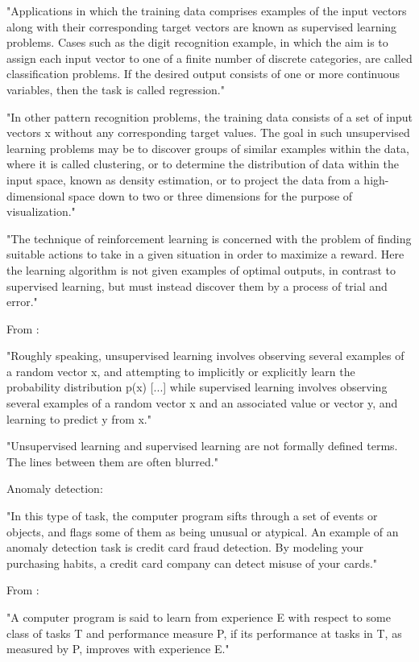 "Applications in which the training data comprises examples of the input vectors along with their corresponding target vectors are known as supervised learning problems. Cases such as the digit recognition example, in which the aim is to assign each input vector to one of a finite number of discrete categories, are called classification problems. If the desired output consists of one or more continuous variables, then the task is called regression."

"In other pattern recognition problems, the training data consists of a set of input vectors x without any corresponding target values. The goal in such unsupervised learning problems may be to discover groups of similar examples within the data, where it is called clustering, or to determine the distribution of data within the input space, known as density estimation, or to project the data from a high-dimensional space down to two or three dimensions for the purpose of visualization."

"The technique of reinforcement learning is concerned with the problem of finding suitable actions to take in a given situation in order to maximize a reward. Here the learning algorithm is not given examples of optimal outputs, in contrast to supervised learning, but must instead discover them by a process of trial and error."

From \parencite{Goodfellow-et-al-2016} :

"Roughly speaking, unsupervised learning involves observing several examples of a random vector x, and attempting to implicitly or explicitly learn the probability distribution p(x) [...] while supervised learning involves observing several examples of a random vector x and an associated value or vector y, and learning to predict y from x."

"Unsupervised learning and supervised learning are not formally defined terms. The lines between them are often blurred."

Anomaly detection: 

"In this type of task, the computer program sifts through a set of events or objects, and flags some of them as being unusual or atypical. An example of an anomaly detection task is credit card fraud detection. By modeling your purchasing habits, a credit card company can detect misuse of your cards."

From \parencite{mitchell1997machine_learning} :

"A computer program is said to learn from experience E with respect to some class of tasks T and performance measure P, if its performance at tasks in T, as measured by P, improves with experience E."

